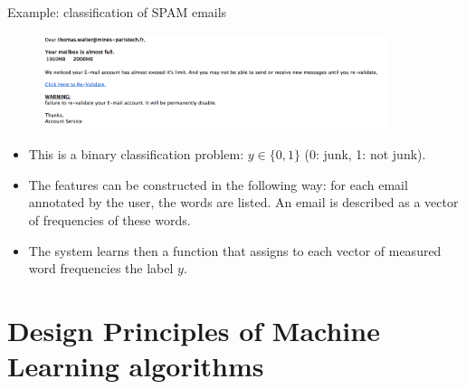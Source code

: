 \documentclass[xcolor=pdftex,dvipsnames,table]{beamer}
\begin{document}
\begin{frame}{Example: classification of SPAM emails}
\begin{figure}[htb]
\includegraphics[width=0.9\textwidth]{../graphics/SPAM_mail.png}
\end{figure}
\begin{itemize}
	\item This is a binary classification problem: $y \in \{0,1\}$ (0: junk, 1: not junk). 
	\item The features can be constructed in the following way: for each email annotated by the user, the words are listed. An email is described as a vector of frequencies of these words. 
	\item The system learns then a function that assigns to each vector of measured word frequencies the label $y$. 
\end{itemize}
\end{frame}



\section{Design Principles of Machine Learning algorithms}
\end{document}
